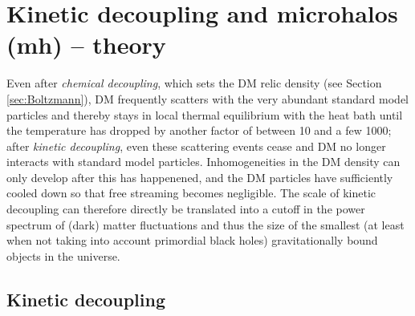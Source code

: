\section{Kinetic decoupling and microhalos (mh) -- theory}
\label{sec:mh}

Even after \emph{chemical decoupling}, which sets the DM relic density (see Section 
\ref{sec:Boltzmann}), DM  frequently scatters with the very abundant 
standard model particles and thereby stays in local thermal equilibrium with the 
heat bath until the temperature has dropped by another factor of between 10 and
 a few 1000; after \emph{kinetic decoupling}, even these scattering events cease and DM 
no longer interacts with standard model particles. Inhomogeneities 
in the DM density can only develop after this has happenened, and the DM particles have
sufficiently cooled down so that free streaming becomes negligible.
The scale of kinetic decoupling can therefore directly be translated 
into a cutoff in the power spectrum of (dark) matter fluctuations and thus the size of the 
smallest (at least when not taking into account primordial black holes) gravitationally 
bound objects in the universe.



\subsection{Kinetic decoupling}

